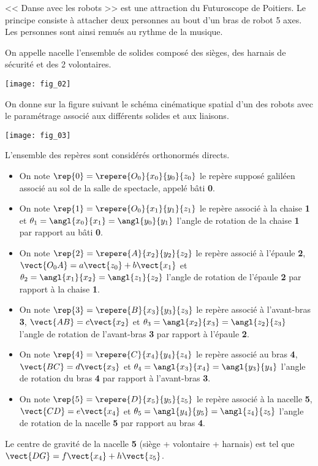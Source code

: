 \ifprof
\else
\begin{multicols}{2}
\fi


<< Danse avec les robots >> est une attraction du Futuroscope de Poitiers. Le principe consiste à attacher deux personnes au bout d'un bras de robot 5 axes. Les personnes sont ainsi remués au rythme de la musique.

On appelle nacelle l'ensemble de solides composé des sièges, des harnais de sécurité et des 2 volontaires. 

\begin{center}
\texttt{[image: fig\_02]}
\end{center}


On donne sur la figure suivant le schéma cinématique spatial d'un des robots avec le paramétrage associé aux différents solides et aux liaisons. 

\begin{center}
\texttt{[image: fig\_03]}
\end{center}

L'ensemble des repères sont considérés orthonormés directs.


\begin{itemize}
\item On note $\rep{0}=\repere{O_0}{x_0}{y_0}{z_0}$ le repère supposé galiléen associé au sol de la salle de spectacle, appelé bâti \textbf{0}.
\item On note $\rep{1}=\repere{O_0}{x_1}{y_1}{z_1}$ le repère associé à la chaise \textbf{1} et $\theta_1=\angl{x_0}{x_1}=\angl{y_0}{y_1}$ l'angle de rotation de la chaise \textbf{1} par rapport au bâti \textbf{0}.
\item On note $\rep{2}=\repere{A}{x_2}{y_2}{z_2}$ le repère associé à l'épaule \textbf{2}, $\vect{O_0A} = a\vect{z_0} + b\vect{x_1}$ et $\theta_2=\angl{x_1}{x_2}=\angl{z_1}{z_2}$ l'angle de rotation de l'épaule \textbf{2} par rapport à la chaise \textbf{1}.
\item On note $\rep{3}=\repere{B}{x_3}{y_3}{z_3}$ le repère associé à l'avant-bras \textbf{3}, $\vect{AB} = c\vect{x_2}$ et $\theta_3=\angl{x_2}{x_3}=\angl{z_2}{z_3}$ l'angle de rotation de l'avant-bras \textbf{3} par rapport à l'épaule \textbf{2}.
\item On note $\rep{4}=\repere{C}{x_4}{y_4}{z_4}$ le repère associé au bras \textbf{4}, $\vect{BC} = d\vect{x_3}$ et $\theta_4=\angl{x_3}{x_4}=\angl{y_3}{y_4}$ l'angle de rotation du bras \textbf{4} par rapport à l'avant-bras \textbf{3}.
\item On note $\rep{5}=\repere{D}{x_5}{y_5}{z_5}$ le repère associé à la nacelle \textbf{5}, $\vect{CD} = e\vect{x_4}$ et $\theta_5=\angl{y_4}{y_5}=\angl{z_4}{z_5}$ l'angle de rotation de la nacelle \textbf{5} par rapport au bras \textbf{4}.
\end{itemize}
Le centre de gravité de la nacelle \textbf{5} (siège + volontaire + harnais) est tel que $\vect{DG}=f\vect{x_4}+h\vect{z_5}$. 


\end{multicols}
